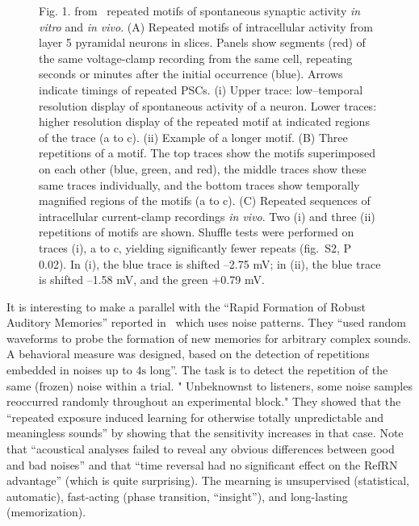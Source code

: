 \documentclass[brainsci, %
               review,submit,pdftex,moreauthors
               ]{Definitions/mdpi}
\begin{document}
\begin{figure}
\centering
\caption{Fig. 1. from~\citep{ikegaya_synfire_2004} repeated motifs of spontaneous synaptic activity \textit{in vitro} and \textit{in vivo}. (A) Repeated motifs of intracellular activity from layer 5 pyramidal neurons in slices. Panels show segments (red) of the same voltage-clamp recording from the same cell, repeating seconds or minutes after the initial occurrence (blue). Arrows indicate timings of repeated PSCs. (i) Upper trace: low--temporal resolution display of spontaneous activity of a neuron. Lower traces: higher resolution display of the repeated motif at indicated regions of the trace (a to c). (ii) Example of a longer motif. (B) Three repetitions of a motif. The top traces show the motifs superimposed on each other (blue, green, and red), the middle traces show these same traces individually, and the bottom traces show temporally magnified regions of the motifs (a to c). (C) Repeated sequences of intracellular current-clamp recordings \textit{in vivo}. Two (i) and three (ii) repetitions of motifs are shown. Shuffle tests were performed on traces (i), a to c, yielding significantly fewer repeats (fig.~S2, P  0.02). In (i), the blue trace is shifted --2.75 mV; in (ii), the blue trace is shifted --1.58 mV, and the green +0.79 mV.}\label{fig:Ikegaya2004}
\end{figure}

It is interesting to make a parallel with the ``Rapid Formation of Robust Auditory Memories'' reported in~\citep{agus_rapid_2010} which uses noise patterns. They ``used random waveforms to probe the formation of new memories for arbitrary complex sounds. A behavioral measure was designed, based on the detection of repetitions embedded in noises up to $4 \si{\second}$ long''. The task is to detect the repetition of the same (frozen) noise within a trial. " Unbeknownst to listeners, some noise samples reoccurred randomly throughout an experimental block." They showed that the ``repeated exposure induced learning for otherwise totally unpredictable and meaningless sounds'' by showing that the sensitivity increases in that case. Note that ``acoustical analyses failed to reveal any obvious differences between good and bad noises'' and that ``time reversal had no significant effect on the RefRN advantage'' (which is quite surprising). The mearning is unsupervised (statistical, automatic), fast-acting (phase transition, ``insight''), and long-lasting (memorization).
\end{document}

